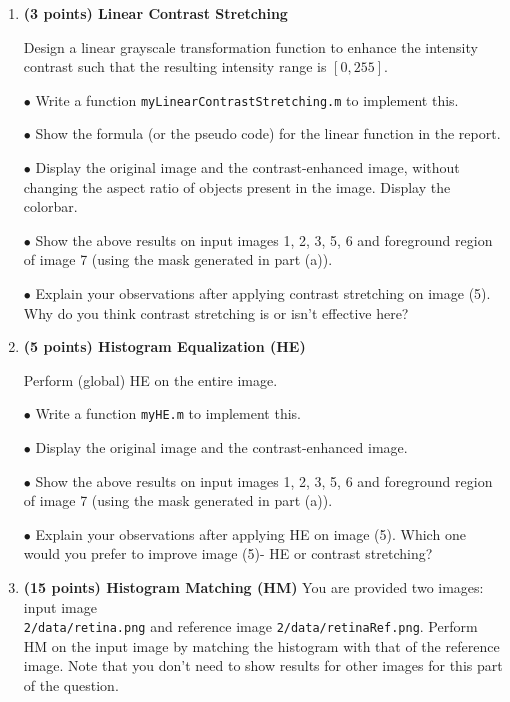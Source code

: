 \documentclass[11pt]{article}
\begin{document}
\begin {enumerate}
\begin {enumerate}
    $\bullet$ Write a function \texttt{myForegroundMask.m} to implement this.
    
    $\bullet$ Display the original image, the binary mask and the masked image.
  
  \item \textbf{(3 points) Linear Contrast Stretching}
    
    Design a linear grayscale transformation function to enhance the intensity contrast such that the resulting intensity range is $[0,255]$. 
    
    $\bullet$ Write a function \texttt{myLinearContrastStretching.m} to implement this.
    
    $\bullet$ Show the formula (or the pseudo code) for the linear function in the report.
    
    $\bullet$ Display the original image and the contrast-enhanced image, without changing the aspect ratio of objects present in the image. Display the colorbar.

    $\bullet$ Show the above results on input images 1, 2, 3, 5, 6 and foreground region of image 7 (using the mask generated in part (a)).

    $\bullet$ Explain your observations after applying contrast stretching on image (5). Why do you think contrast stretching is or isn't effective here? 
    
  \item \textbf{(5 points) Histogram Equalization (HE)}
    
    Perform (global) HE on the entire image.
    
    $\bullet$ Write a function \texttt{myHE.m} to implement this.
    
    $\bullet$ Display the original image and the contrast-enhanced image.
    
    $\bullet$ Show the above results on input images 1, 2, 3, 5, 6 and foreground region of image 7 (using the mask generated in part (a)).
    
    $\bullet$ Explain your observations after applying HE on image (5). Which one would you prefer to improve image (5)- HE or contrast stretching?
    
  \item \textbf{(15 points) Histogram Matching (HM)} You are provided two images: input image \\
  \texttt{2/data/retina.png} and reference image
    \texttt{2/data/retinaRef.png}. Perform HM on the input image by matching the histogram with that of the reference image. Note that you don't
    need to show results for other images for this part of the question.


\end{enumerate}
\end{enumerate}
\end{document}
